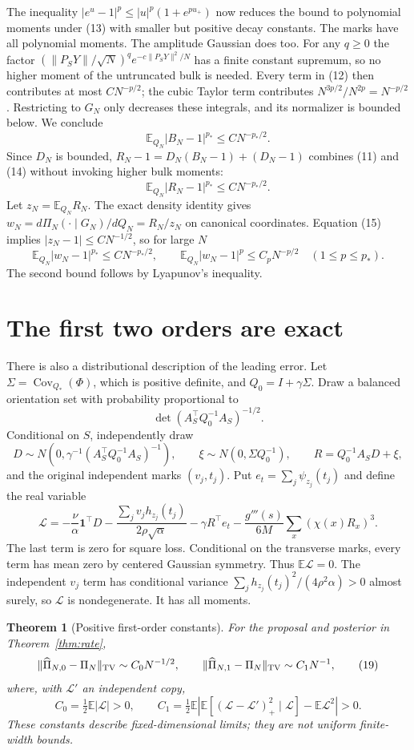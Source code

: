 \documentclass[11pt]{article}
\newtheorem{theorem}{Theorem}\newtheorem{lemma}[theorem]{Lemma}
\newcommand{\E}{\mathbb E}\newcommand{\R}{\mathbb R}
\begin{document}
The inequality $|e^u-1|^p\le |u|^p(1+e^{pu_+})$ now reduces the
bound to polynomial moments under (13) with smaller but positive decay
constants. The marks have all polynomial moments. The amplitude Gaussian
does too. For any $q\ge0$ the factor
$(\|P_SY\|/\sqrt N)^q e^{-c\|P_SY\|^2/N}$ has a finite constant
supremum, so no higher moment of the untruncated bulk is needed.
Every term in (12) then contributes at most $CN^{-p/2}$; the cubic
Taylor term contributes $N^{3p/2}/N^{2p}=N^{-p/2}$. Restricting to
$G_N$ only decreases these integrals, and its normalizer is bounded
below. We conclude
\[
                         \E_{Q_N}|B_N-1|^{p_*}\le CN^{-p_*/2}. \tag{14}
\]
Since $D_N$ is bounded, $R_N-1=D_N(B_N-1)+(D_N-1)$ combines
(11) and (14) without invoking higher bulk moments:
\[
                         \E_{Q_N}|R_N-1|^{p_*}\le CN^{-p_*/2}. \tag{15}
\]
Let $z_N=\E_{Q_N}R_N$. The exact density identity gives
$w_N=d\Pi_N(\cdot\mid G_N)/dQ_N=R_N/z_N$ on canonical coordinates.
Equation (15) implies $|z_N-1|\le CN^{-1/2}$, so for large $N$
\[
 \E_{Q_N}|w_N-1|^{p_*}\le CN^{-p_*/2},\qquad
 \E_{Q_N}|w_N-1|^p\le C_pN^{-p/2}\quad(1\le p\le p_*). \tag{16}
\]
The second bound follows by Lyapunov's inequality.

\section{The first two orders are exact}
There is also a distributional description of the leading error.
Let $\Sigma=\operatorname{Cov}_{Q_*}(\Phi)$, which is positive definite,
and $Q_0=I+\gamma\Sigma$. Draw a balanced orientation set with probability
proportional to
\[
             \det(A_S^\top Q_0^{-1}A_S)^{-1/2}.          \tag{17}
\]
Conditional on $S$, independently draw
\[
 D\sim N\left(0,\gamma^{-1}(A_S^\top Q_0^{-1}A_S)^{-1}\right),
 \qquad \xi\sim N(0,\Sigma Q_0^{-1}),
 \qquad R=Q_0^{-1}A_SD+\xi,
\]
and the original independent marks $(v_j,t_j)$. Put
$e_t=\sum_j\psi_{z_j}(t_j)$ and define the real variable
\[
 \mathcal L=-\frac\nu\alpha\mathbf1^\top D
 -\frac{\sum_jv_jh_{z_j}(t_j)}{2\rho\sqrt\alpha}
 -\gamma R^\top e_t
 -\frac{g'''(s)}{6M}\sum_x(\chi(x)R_x)^3.               \tag{18}
\]
The last term is zero for square loss. Conditional on the transverse
marks, every term has mean zero by centered Gaussian symmetry. Thus
$\E\mathcal L=0$. The independent $v_j$ term has conditional variance
$\sum_jh_{z_j}(t_j)^2/(4\rho^2\alpha)>0$ almost surely, so
$\mathcal L$ is nondegenerate. It has all moments.

\begin{theorem}[Positive first-order constants]\label{thm:constants}
For the proposal and posterior in Theorem~\ref{thm:rate},
\[
 \|\widehat\Pi_{N,0}-\Pi_N\|_{\mathrm{TV}}\sim C_0N^{-1/2},
 \qquad
 \|\widehat\Pi_{N,1}-\Pi_N\|_{\mathrm{TV}}\sim C_1N^{-1},       \tag{19}
\]
where, with $\mathcal L'$ an independent copy,
\[
 C_0=\tfrac12\E|\mathcal L|>0,\qquad
 C_1=\tfrac12\E\left|\E[(\mathcal L-\mathcal L')_+^2
                                   \mid\mathcal L]-\E\mathcal L^2\right|>0.
 \tag{20}
\]
These constants describe fixed-dimensional limits; they are not uniform
finite-width bounds.
\end{theorem}
\end{document}

